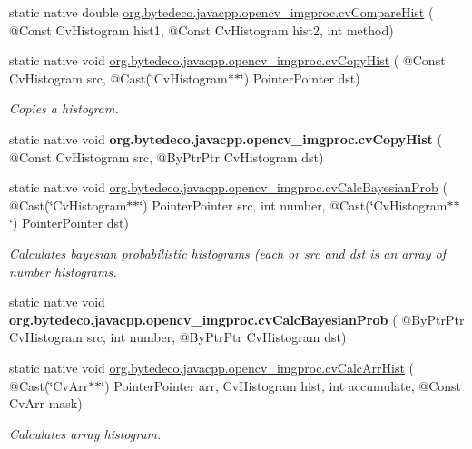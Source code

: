 \begin{DoxyCompactItemize}
static native double \hyperlink{group__imgproc__c_gae639bb492f6f6f8434a3bf4a6ae085c9}{org.\+bytedeco.\+javacpp.\+opencv\+\_\+imgproc.\+cv\+Compare\+Hist} ( @Const Cv\+Histogram hist1, @Const Cv\+Histogram hist2, int method)
\item 
static native void \hyperlink{group__imgproc__c_ga8d6e92f294d7853bc6a9435443b56c5d}{org.\+bytedeco.\+javacpp.\+opencv\+\_\+imgproc.\+cv\+Copy\+Hist} ( @Const Cv\+Histogram src, @Cast(\char`\"{}Cv\+Histogram$\ast$$\ast$\char`\"{}) Pointer\+Pointer dst)
\begin{DoxyCompactList}\small\item\em Copies a histogram. \end{DoxyCompactList}\item 
\mbox{\label{group__imgproc__c_ga149e42a56c55adad9b552ba0d17b8aa7}} 
static native void {\bfseries org.\+bytedeco.\+javacpp.\+opencv\+\_\+imgproc.\+cv\+Copy\+Hist} ( @Const Cv\+Histogram src, @By\+Ptr\+Ptr Cv\+Histogram dst)
\item 
\mbox{\label{group__imgproc__c_ga2c80ef0ae6c6bdbe45649905b8c8e462}} 
static native void \hyperlink{group__imgproc__c_ga2c80ef0ae6c6bdbe45649905b8c8e462}{org.\+bytedeco.\+javacpp.\+opencv\+\_\+imgproc.\+cv\+Calc\+Bayesian\+Prob} ( @Cast(\char`\"{}Cv\+Histogram$\ast$$\ast$\char`\"{}) Pointer\+Pointer src, int number, @Cast(\char`\"{}Cv\+Histogram$\ast$$\ast$\char`\"{}) Pointer\+Pointer dst)
\begin{DoxyCompactList}\small\item\em Calculates bayesian probabilistic histograms (each or src and dst is an array of {\itshape number} histograms. \end{DoxyCompactList}\item 
\mbox{\label{group__imgproc__c_gab0b23a08c44f14cec9bd1d4f48c71bc8}} 
static native void {\bfseries org.\+bytedeco.\+javacpp.\+opencv\+\_\+imgproc.\+cv\+Calc\+Bayesian\+Prob} ( @By\+Ptr\+Ptr Cv\+Histogram src, int number, @By\+Ptr\+Ptr Cv\+Histogram dst)
\item 
static native void \hyperlink{group__imgproc__c_gabbad99d1facb93d0701c7476e407a2f5}{org.\+bytedeco.\+javacpp.\+opencv\+\_\+imgproc.\+cv\+Calc\+Arr\+Hist} ( @Cast(\char`\"{}Cv\+Arr$\ast$$\ast$\char`\"{}) Pointer\+Pointer arr, Cv\+Histogram hist, int accumulate, @Const Cv\+Arr mask)
\begin{DoxyCompactList}\small\item\em Calculates array histogram. \end{DoxyCompactList}\item 

\end{DoxyCompactItemize}
